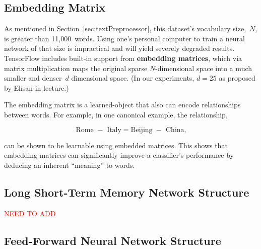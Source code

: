 \documentclass{report}
\begin{document}
  
  \subsection{Embedding Matrix}\label{sec:embeddingMatrix}
  
  As mentioned in Section~\ref{sec:textPreprocessor}, this dataset's vocabulary size,~$N$, is greater than 11,000~words.  Using one's personal computer to train a neural network of that size is impractical and will yield severely degraded results. TensorFlow includes built-in support from \textbf{embedding matrices}, which via matrix multiplication maps the original sparse $N$-dimensional space into a much smaller and denser~$d$ dimensional space. (In our experiments, $d=25$ as proposed by Ehsan in lecture.)  
  
  The embedding matrix is a learned-object that also can encode relationships between words.  For example, in one canonical example, the relationship, 
  
  \[\text{Rome } - \text{ Italy} = \text{Beijing } - \text{ China}\textrm{,}\]
  
  \noindent
  can be shown to be learnable using embedded matrices.  This shows that embedding matrices can significantly improve a classifier's performance by deducing an inherent ``meaning'' to words.
  
  \subsection{Long Short-Term Memory Network Structure}\label{sec:lstemOverview}
  
  {\textcolor{red}{\Large NEED TO ADD}}
  
  \subsection{Feed-Forward Neural Network Structure}\label{sec:neuralNetOverview}
  
\end{document}
